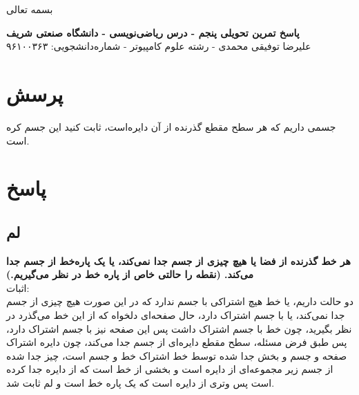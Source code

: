 \documentclass[12pt,a4paper]{article}
\begin{document}
\begin{center}
	بسمه تعالی
\end{center}
\begin{center}
	\textbf{پاسخ تمرین تحویلی پنجم - درس ریاضی‌نویسی - دانشگاه صنعتی شریف}
	\\
	علیرضا توفیقی محمدی - رشته علوم کامپیوتر - شماره‌دانشجویی: ۹۶۱۰۰۳۶۳
\end{center}
\section*{پرسش}
جسمی داریم که هر سطح مقطع گذرنده از آن دایره‌است، ثابت کنید این جسم کره است.
\section*{پاسخ}
\subsection*{لم}
\textbf{
هر خط گذرنده از فضا یا هیچ چیزی از جسم جدا نمی‌کند، یا یک پاره‌خط از جسم جدا می‌کند. (نقطه را حالتی خاص از پاره خط در نظر می‌گیریم.)
}
\\
اثبات:
\\
دو حالت داریم، یا خط هیچ اشتراکی با جسم ندارد که در این صورت هیچ چیزی از جسم جدا نمی‌کند، یا با جسم اشتراک دارد، حال صفحه‌ای دلخواه که از این خط می‌گذرد در نظر بگیرید، چون خط با جسم اشتراک داشت پس این صفحه نیز با جسم اشتراک دارد، پس طبق فرض مسئله، سطح مقطع دایره‌ای از جسم جدا می‌کند، چون دایره اشتراک صفحه و جسم و بخش جدا شده توسط خط اشتراک خط و جسم است، چیز جدا شده از جسم زیر مجموعه‌ای از دایره است و بخشی از خط است که از دایره جدا کرده است پس وتری از دایره است که یک پاره خط است و لم ثابت شد.
\end{document}

